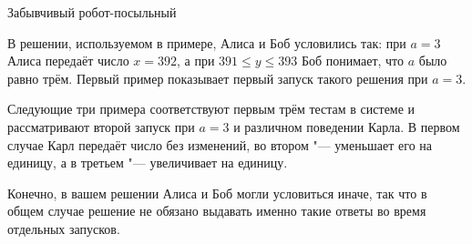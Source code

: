\begin{problem}{Забывчивый робот-посыльный}
\Explanations

В решении, используемом в примере, Алиса и Боб условились так:
при $a = 3$ Алиса передаёт число $x = 392$,
а при $391 \le y \le 393$ Боб понимает, что $a$ было равно трём.
Первый пример показывает первый запуск такого решения при $a = 3$.

Следующие три примера соответствуют первым трём тестам в системе
и рассматривают второй запуск при $a = 3$ и различном поведении Карла.
В первом случае Карл передаёт число без изменений,
во втором "--- уменьшает его на единицу,
а в третьем "--- увеличивает на единицу.

Конечно, в вашем решении Алиса и Боб могли условиться иначе,
так что в общем случае решение не обязано выдавать именно такие ответы
во время отдельных запусков.

\end{problem}

